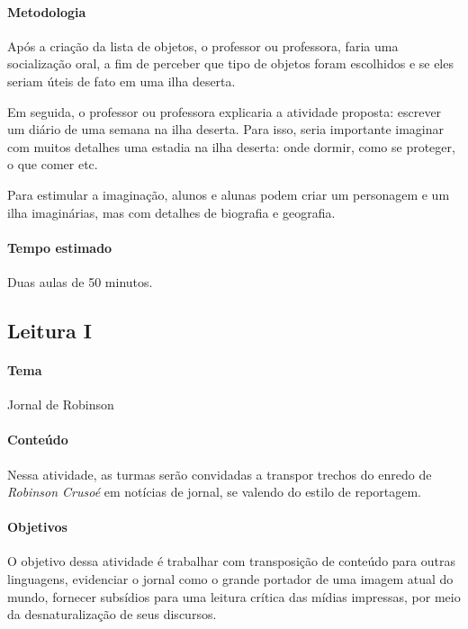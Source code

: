 \documentclass[12pt]{extarticle}
\begin{document}
\paragraph{Metodologia}
Após a criação da lista de objetos, o professor ou professora, faria uma
socialização oral, a fim de perceber que tipo de objetos foram
escolhidos e se eles seriam úteis de fato em uma ilha deserta.

Em seguida, o professor ou professora explicaria a atividade proposta:
escrever um diário de uma semana na ilha deserta. Para isso, seria
importante imaginar com muitos detalhes uma estadia na ilha deserta:
onde dormir, como se proteger, o que comer etc.

Para estimular a imaginação, alunos e alunas podem criar um personagem e
um ilha imaginárias, mas com detalhes de biografia e geografia.

\paragraph{Tempo estimado} Duas aulas de 50 minutos.

\subsection{Leitura I}

\paragraph{Tema} Jornal de Robinson


\paragraph{Conteúdo} Nessa atividade, as turmas serão convidadas a transpor trechos do enredo de \emph{Robinson Crusoé} em notícias de jornal, se valendo do estilo de
reportagem.

\paragraph{Objetivos}
O objetivo dessa atividade é trabalhar com transposição de conteúdo para
outras linguagens, evidenciar o jornal como o grande portador de uma
imagem atual do mundo, fornecer subsídios para uma leitura crítica das
mídias impressas, por meio da desnaturalização de seus discursos.
\end{document}
